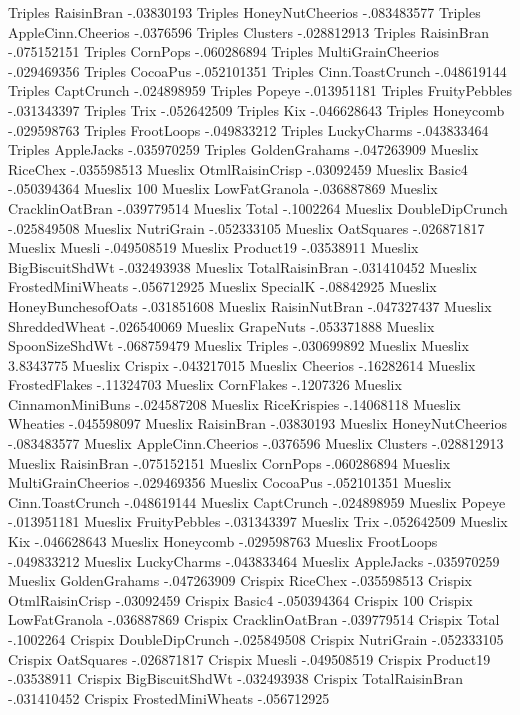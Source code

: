 Triples	RaisinBran	-.03830193
Triples	HoneyNutCheerios	-.083483577
Triples	AppleCinn.Cheerios	-.0376596
Triples	Clusters	-.028812913
Triples	RaisinBran	-.075152151
Triples	CornPops	-.060286894
Triples	MultiGrainCheerios	-.029469356
Triples	CocoaPus	-.052101351
Triples	Cinn.ToastCrunch	-.048619144
Triples	CaptCrunch	-.024898959
Triples	Popeye	-.013951181
Triples	FruityPebbles	-.031343397
Triples	Trix	-.052642509
Triples	Kix	-.046628643
Triples	Honeycomb	-.029598763
Triples	FrootLoops	-.049833212
Triples	LuckyCharms	-.043833464
Triples	AppleJacks	-.035970259
Triples	GoldenGrahams	-.047263909
Mueslix	RiceChex	-.035598513
Mueslix	OtmlRaisinCrisp	-.03092459
Mueslix	Basic4	-.050394364
Mueslix	100%
Mueslix	LowFatGranola	-.036887869
Mueslix	CracklinOatBran	-.039779514
Mueslix	Total	-.1002264
Mueslix	DoubleDipCrunch	-.025849508
Mueslix	NutriGrain	-.052333105
Mueslix	OatSquares	-.026871817
Mueslix	Muesli	-.049508519
Mueslix	Product19	-.03538911
Mueslix	BigBiscuitShdWt	-.032493938
Mueslix	TotalRaisinBran	-.031410452
Mueslix	FrostedMiniWheats	-.056712925
Mueslix	SpecialK	-.08842925
Mueslix	HoneyBunchesofOats	-.031851608
Mueslix	RaisinNutBran	-.047327437
Mueslix	ShreddedWheat	-.026540069
Mueslix	GrapeNuts	-.053371888
Mueslix	SpoonSizeShdWt	-.068759479
Mueslix	Triples	-.030699892
Mueslix	Mueslix	3.8343775
Mueslix	Crispix	-.043217015
Mueslix	Cheerios	-.16282614
Mueslix	FrostedFlakes	-.11324703
Mueslix	CornFlakes	-.1207326
Mueslix	CinnamonMiniBuns	-.024587208
Mueslix	RiceKrispies	-.14068118
Mueslix	Wheaties	-.045598097
Mueslix	RaisinBran	-.03830193
Mueslix	HoneyNutCheerios	-.083483577
Mueslix	AppleCinn.Cheerios	-.0376596
Mueslix	Clusters	-.028812913
Mueslix	RaisinBran	-.075152151
Mueslix	CornPops	-.060286894
Mueslix	MultiGrainCheerios	-.029469356
Mueslix	CocoaPus	-.052101351
Mueslix	Cinn.ToastCrunch	-.048619144
Mueslix	CaptCrunch	-.024898959
Mueslix	Popeye	-.013951181
Mueslix	FruityPebbles	-.031343397
Mueslix	Trix	-.052642509
Mueslix	Kix	-.046628643
Mueslix	Honeycomb	-.029598763
Mueslix	FrootLoops	-.049833212
Mueslix	LuckyCharms	-.043833464
Mueslix	AppleJacks	-.035970259
Mueslix	GoldenGrahams	-.047263909
Crispix	RiceChex	-.035598513
Crispix	OtmlRaisinCrisp	-.03092459
Crispix	Basic4	-.050394364
Crispix	100%
Crispix	LowFatGranola	-.036887869
Crispix	CracklinOatBran	-.039779514
Crispix	Total	-.1002264
Crispix	DoubleDipCrunch	-.025849508
Crispix	NutriGrain	-.052333105
Crispix	OatSquares	-.026871817
Crispix	Muesli	-.049508519
Crispix	Product19	-.03538911
Crispix	BigBiscuitShdWt	-.032493938
Crispix	TotalRaisinBran	-.031410452
Crispix	FrostedMiniWheats	-.056712925
